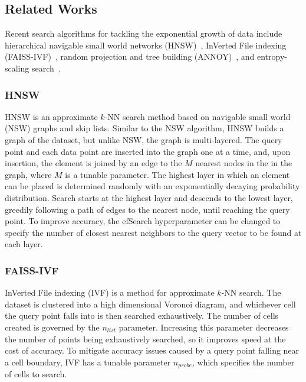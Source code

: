 \subsection{Related Works}
\label{subsec:intoduction:related-works}

Recent search algorithms for tackling the exponential growth of data include hierarchical navigable small world networks (HNSW)~\cite{Malkov2016EfficientAR}, InVerted File indexing (FAISS-IVF)~\cite{faissivf}, random projection and tree building (ANNOY)~\cite{annoy}, and entropy-scaling search~\cite{yu2015entropy, ishaq2019clustered}.


\subsubsection{HNSW}
\label{subsubsec:introduction:related-works:hnsw}

HNSW is an approximate $k$-NN search method based on navigable small world (NSW) graphs and skip lists. 
Similar to the NSW algorithm, HNSW builds a graph of the dataset, but unlike NSW, the graph is multi-layered.
The query point and each data point are inserted into the graph one at a time, and, upon insertion, the element is joined by an edge to the $M$ nearest nodes in the in the graph, where $M$ is a tunable parameter. 
The highest layer in which an element can be placed is determined randomly with an exponentially decaying probability distribution.
Search starts at the highest layer and descends to the lowest layer, greedily following a path of edges to the nearest node, until reaching the query point. 
To improve accuracy, the efSearch hyperparameter can be changed to specify the number of closest nearest neighbors to the query vector to be found at each layer. 


\subsubsection{FAISS-IVF}
\label{subsubsec:introduction:related-works:faiss-ivf}

InVerted File indexing (IVF) is a method for approximate $k$-NN search. 
The dataset is clustered into a high dimensional Voronoi diagram, and whichever cell the query point falls into is then searched exhaustively.
The number of cells created is governed by the $n_{list}$ parameter. 
Increasing this parameter decreases the number of points being exhaustively searched, so it improves speed at the cost of accuracy.
To mitigate accuracy issues caused by a query point falling near a cell boundary, IVF has a tunable parameter $n_{probe}$, which specifies the number of cells to search.


